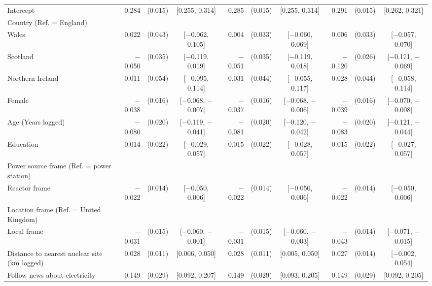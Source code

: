 \begin{landscape}
\begin{longtable}[t]{>{\raggedright\arraybackslash}p{2.8in}rrcrrcrrc}
\endfoot
\bottomrule
\endlastfoot
Intercept & 0.284 & (0.015) & {}[0.255, 0.314] & 0.285 & (0.015) & {}[0.255, 0.314] & 0.291 & (0.015) & {}[0.262, 0.321]\\
Country (Ref. = England) &  &  &  &  &  &  &  &  & \\
\hspace{1em}Wales & 0.022 & (0.043) & {}[$-$0.062, 0.105] & 0.004 & (0.033) & {}[$-$0.060, 0.069] & 0.006 & (0.033) & {}[$-$0.057, 0.070]\\
\hspace{1em}Scotland & $-$0.050 & (0.035) & {}[$-$0.119, 0.019] & $-$0.051 & (0.035) & {}[$-$0.119, 0.018] & $-$0.120 & (0.026) & {}[$-$0.171, $-$0.069]\\
\hspace{1em}Northern Ireland & 0.011 & (0.054) & {}[$-$0.095, 0.114] & 0.031 & (0.044) & {}[$-$0.055, 0.117] & 0.028 & (0.044) & {}[$-$0.058, 0.114]\\
Female & $-$0.038 & (0.016) & {}[$-$0.068, $-$0.007] & $-$0.037 & (0.016) & {}[$-$0.068, $-$0.006] & $-$0.039 & (0.016) & {}[$-$0.070, $-$0.008]\\
Age (Years logged) & $-$0.080 & (0.020) & {}[$-$0.119, $-$0.041] & $-$0.081 & (0.020) & {}[$-$0.120, $-$0.042] & $-$0.083 & (0.020) & {}[$-$0.121, $-$0.044]\\
Education & 0.014 & (0.022) & {}[$-$0.029, 0.057] & 0.015 & (0.022) & {}[$-$0.028, 0.057] & 0.015 & (0.022) & {}[$-$0.027, 0.057]\\
Power source frame (Ref. = power station) &  &  &  &  &  &  &  &  & \\
\hspace{1em}Reactor frame & $-$0.022 & (0.014) & {}[$-$0.050, 0.006] & $-$0.022 & (0.014) & {}[$-$0.050, 0.006] & $-$0.022 & (0.014) & {}[$-$0.050, 0.006]\\
Location frame (Ref. = United Kingdom) &  &  &  &  &  &  &  &  & \\
\hspace{1em}Local frame & $-$0.031 & (0.015) & {}[$-$0.060, $-$0.001] & $-$0.031 & (0.015) & {}[$-$0.060, $-$0.003] & $-$0.043 & (0.014) & {}[$-$0.071, $-$0.015]\\
Distance to nearest nuclear site (km logged) & 0.028 & (0.011) & {}[0.006, 0.050] & 0.028 & (0.011) & {}[0.005, 0.050] & 0.027 & (0.014) & {}[$-$0.002, 0.054]\\
Follow news about electricity & 0.149 & (0.029) & {}[0.092, 0.207] & 0.149 & (0.029) & {}[0.093, 0.205] & 0.149 & (0.029) & {}[0.092, 0.205]\\

\end{longtable}
\end{landscape}
